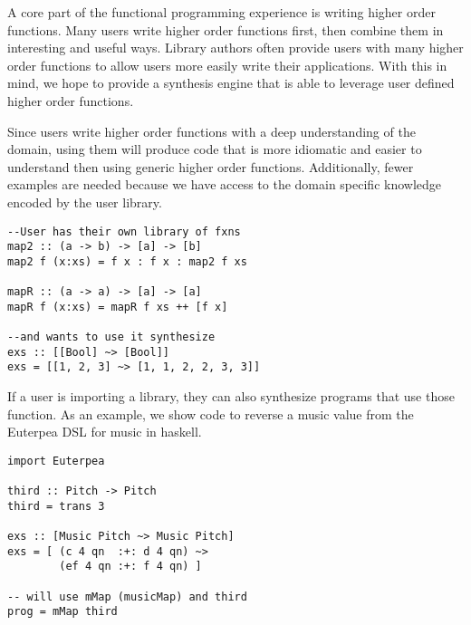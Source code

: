 A core part of the functional programming experience is writing higher order functions. Many users write higher order functions first, then combine them in interesting and useful ways. Library authors often provide users with many higher order functions to allow users more easily write their applications. With this in mind, we hope to provide a synthesis engine that is able to leverage user defined higher order functions. 

Since users write higher order functions with a deep understanding of the domain, using them will produce code that is more idiomatic and easier to understand then using generic higher order functions. Additionally, fewer examples are needed because we have access to the domain specific knowledge encoded by the user library.

\begin{verbatim}
--User has their own library of fxns
map2 :: (a -> b) -> [a] -> [b]
map2 f (x:xs) = f x : f x : map2 f xs

mapR :: (a -> a) -> [a] -> [a]
mapR f (x:xs) = mapR f xs ++ [f x]

--and wants to use it synthesize
exs :: [[Bool] ~> [Bool]]
exs = [[1, 2, 3] ~> [1, 1, 2, 2, 3, 3]]
\end{verbatim}


If a user is importing a library, they can also synthesize programs that use those function. As an example, we show code to reverse a music value from the Euterpea DSL for music in haskell.

\begin{verbatim}
import Euterpea

third :: Pitch -> Pitch
third = trans 3

exs :: [Music Pitch ~> Music Pitch]
exs = [ (c 4 qn  :+: d 4 qn) ~>
        (ef 4 qn :+: f 4 qn) ]
        
-- will use mMap (musicMap) and third
prog = mMap third
\end{verbatim}